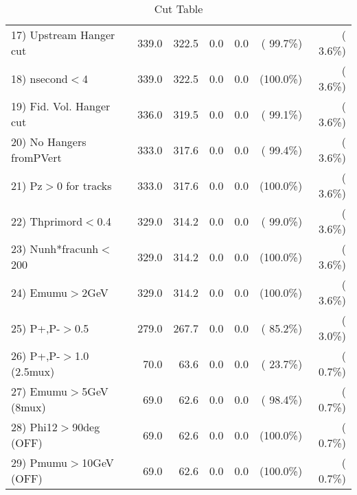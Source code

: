 \begin{table}[h!]
\begin{tabular}{||l||r|r|r|r|r|r||}
 17) Upstream Hanger cut  &        339.0 &        322.5 &          0.0 &          0.0 & ( 99.7\%) & (  3.6\%) \\
 18) nsecond$<$4          &        339.0 &        322.5 &          0.0 &          0.0 & (100.0\%) & (  3.6\%) \\
 19) Fid. Vol. Hanger cut &        336.0 &        319.5 &          0.0 &          0.0 & ( 99.1\%) & (  3.6\%) \\
 20) No Hangers fromPVert &        333.0 &        317.6 &          0.0 &          0.0 & ( 99.4\%) & (  3.6\%) \\
 21) Pz$>$0 for tracks    &        333.0 &        317.6 &          0.0 &          0.0 & (100.0\%) & (  3.6\%) \\
 22) Thprimord$<$0.4      &        329.0 &        314.2 &          0.0 &          0.0 & ( 99.0\%) & (  3.6\%) \\
 23) Nunh*fracunh$<$200   &        329.0 &        314.2 &          0.0 &          0.0 & (100.0\%) & (  3.6\%) \\
 24) Emumu$>$2GeV         &        329.0 &        314.2 &          0.0 &          0.0 & (100.0\%) & (  3.6\%) \\
 25) P+,P-$>$0.5          &        279.0 &        267.7 &          0.0 &          0.0 & ( 85.2\%) & (  3.0\%) \\
 26) P+,P-$>$1.0 (2.5mux) &         70.0 &         63.6 &          0.0 &          0.0 & ( 23.7\%) & (  0.7\%) \\
 27) Emumu$>$5GeV  (8mux) &         69.0 &         62.6 &          0.0 &          0.0 & ( 98.4\%) & (  0.7\%) \\
 28) Phi12$>$90deg  (OFF) &         69.0 &         62.6 &          0.0 &          0.0 & (100.0\%) & (  0.7\%) \\
 29) Pmumu$>$10GeV  (OFF) &         69.0 &         62.6 &          0.0 &          0.0 & (100.0\%) & (  0.7\%) \\
 \hline
 \hline
 \end{tabular}
 \caption{Cut Table           }
 \label{tab-cutcohjpsi-mumu_jpsi}
 \end{table}
